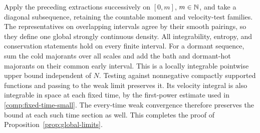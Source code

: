 Apply the preceding extractions successively on $[0,m]$, $m\in\mathbb N$,
and take a diagonal subsequence, retaining the countable moment and
velocity-test families. The representatives on overlapping intervals
agree by their smooth pairings, so they define one global strongly
continuous density. All integrability, entropy, and conservation
statements hold on every finite interval. For a dormant sequence, sum
the cold majorants over all scales and add the bath and dormant-hot
majorants on their common early interval. This is a locally integrable
pointwise upper bound independent of $N$. Testing against nonnegative
compactly supported functions and passing to the weak limit preserves
it. Its velocity integral is also integrable in space at each fixed
time, by the first-power estimate used in
\eqref{comp:fixed-time-small}. The every-time weak convergence therefore
preserves the bound at each such time section as well. This completes
the proof of Proposition~\ref{prop:global-limits}.
